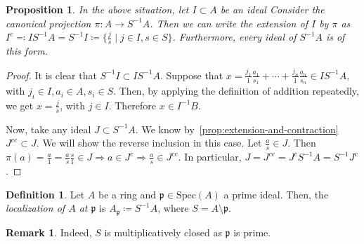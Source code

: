 \documentclass[11pt]{article}
\newtheorem{prop}[theorem]{Proposition}
\theoremstyle{definition}
\newtheorem{defn}[theorem]{Definition}
\newtheorem{rk}[theorem]{Remark}
\begin{document}
        \begin{prop} \label{prop:extension-in-fractions}
            In the above situation, let $I \subset A$ be an ideal Consider the canonical projection $\pi: A \rightarrow S^{-1}A$.
            Then we can write the extension of $I$ by $\pi$ as
            $I^{e} \eqqcolon IS^{-1}A = S^{-1}I \coloneqq \{\frac{j}{s} \mid j \in I, s \in S \}$.
            Furthermore, every ideal of $S^{-1}A$ is of this form.
        \end{prop}
            \begin{proof}
                    It is clear that $S^{-1}I \subset IS^{-1}A$.
                    Suppose that $x = \frac{j_1}{1} \frac{a_1}{s_1} + \cdots + \frac{j_n}{1} \frac{a_n}{s_n} \in IS^{-1}A$,
                    with $j_i \in I, a_i \in A, s_i \in S$.
                    Then, by applying the definition of addition repeatedly, we get
                    $x = \frac{j}{s}$, with $j \in I$.
                    Therefore $x \in I^{-1}B$.

                    \noindent Now, take any ideal $J \subset S^{-1}A$.
                    We know by~\ref{prop:extension-and-contraction} $J^{ce} \subset J$.
                    We will show the reverse inclusion in this case.
                    Let $\frac{a}{s} \in J.$ Then $\pi(a) = \frac{a}{1} = \frac{a}{s} \frac{s}{1} \in J \Rightarrow a \in J^c \Rightarrow \frac{a}{s} \in J^{ce} $.
                    In particular, $J = J^{ce} = J^{c}S^{-1}A = S^{-1}J^{c}$.
                    \end{proof}

        \begin{defn}
            Let $A$ be a ring and $\mathfrak{p} \in \text{Spec}(A)$ a prime ideal.
            Then, the \emph{localization of $A$ at $\mathfrak{p}$} is $A_{\mathfrak{p}} \coloneqq S^{-1}A$, where $S = A \setminus \mathfrak{p}$.
        \end{defn}

        \begin{rk}
            Indeed, $S$ is multiplicatively closed as $\mathfrak{p}$ is prime.
        \end{rk}
\end{document}
